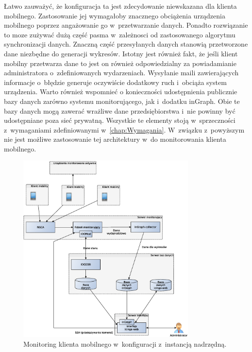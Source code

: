 Łatwo zauważyć, że konfiguracja ta jest zdecydowanie niewskazana dla
klienta mobilnego. Zastosowanie jej wymagałoby znacznego obciążenia
urządzenia mobilnego poprzez angażowanie go w~przetwarzanie
danych. Ponadto rozwiązanie to moze zużywać dużą część pasma
w~zależnosci od zastosowanego algorytmu synchronizacji danych. Znaczną
część przesyłanych danych stanowią przetworzone dane niezbędne do
generacji wykresów. Istotny jest również fakt, że jeśli klient mobilny
przetwarza dane to jest on również odpowiedzialny za powiadamianie
administratora o~zdefiniowanych wydarzeniach. Wysyłanie maili
zawierających informacje o~błędzie generuje oczywiście dodatkowy ruch
i~obciąża system urządzenia. Warto również wspomnieć o konieczności
udostępnienia publicznie bazy danych zarówno systemu monitorującego,
jak i~dodatku inGraph. Obie te bazy danych mogą zawerać wrażliwe dane
przedsiębiorstwa i~nie powinny być udostępniane poza sieć
prywatną. Wszystkie te elementy stoją w~sprzeczności z~wymaganiami
zdefiniowanymi w~\ref{chap:Wymagania}. W~związku z~powyższym nie jest
możliwe zastosowanie tej architektury w~do monitorowania klienta
mobilnego.

\begin{figure}[ht]
  \centering
  \caption{Monitoring klienta mobilnego w~konfiguracji z~instancją
    nadrzędną.}
  \label{fig:mobilnyInstancja}
\includegraphics[width=0.80\textwidth]{img/mobilnyInstancja}
\end{figure}

